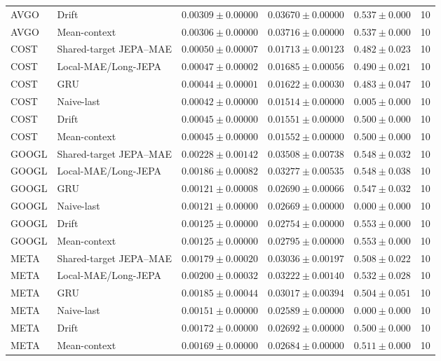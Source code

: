 \begin{longtable}{llrrrr}
AVGO & Drift & $0.00309 \pm 0.00000$ & $0.03670 \pm 0.00000$ & $0.537 \pm 0.000$ & 10 \\
AVGO & Mean-context & $0.00306 \pm 0.00000$ & $0.03716 \pm 0.00000$ & $0.537 \pm 0.000$ & 10 \\
COST & Shared-target JEPA--MAE & $0.00050 \pm 0.00007$ & $0.01713 \pm 0.00123$ & $0.482 \pm 0.023$ & 10 \\
COST & Local-MAE/Long-JEPA & $0.00047 \pm 0.00002$ & $0.01685 \pm 0.00056$ & $0.490 \pm 0.021$ & 10 \\
COST & GRU & $0.00044 \pm 0.00001$ & $0.01622 \pm 0.00030$ & $0.483 \pm 0.047$ & 10 \\
COST & Naive-last & $0.00042 \pm 0.00000$ & $0.01514 \pm 0.00000$ & $0.005 \pm 0.000$ & 10 \\
COST & Drift & $0.00045 \pm 0.00000$ & $0.01551 \pm 0.00000$ & $0.500 \pm 0.000$ & 10 \\
COST & Mean-context & $0.00045 \pm 0.00000$ & $0.01552 \pm 0.00000$ & $0.500 \pm 0.000$ & 10 \\
GOOGL & Shared-target JEPA--MAE & $0.00228 \pm 0.00142$ & $0.03508 \pm 0.00738$ & $0.548 \pm 0.032$ & 10 \\
GOOGL & Local-MAE/Long-JEPA & $0.00186 \pm 0.00082$ & $0.03277 \pm 0.00535$ & $0.548 \pm 0.038$ & 10 \\
GOOGL & GRU & $0.00121 \pm 0.00008$ & $0.02690 \pm 0.00066$ & $0.547 \pm 0.032$ & 10 \\
GOOGL & Naive-last & $0.00121 \pm 0.00000$ & $0.02669 \pm 0.00000$ & $0.000 \pm 0.000$ & 10 \\
GOOGL & Drift & $0.00125 \pm 0.00000$ & $0.02754 \pm 0.00000$ & $0.553 \pm 0.000$ & 10 \\
GOOGL & Mean-context & $0.00125 \pm 0.00000$ & $0.02795 \pm 0.00000$ & $0.553 \pm 0.000$ & 10 \\
META & Shared-target JEPA--MAE & $0.00179 \pm 0.00020$ & $0.03036 \pm 0.00197$ & $0.508 \pm 0.022$ & 10 \\
META & Local-MAE/Long-JEPA & $0.00200 \pm 0.00032$ & $0.03222 \pm 0.00140$ & $0.532 \pm 0.028$ & 10 \\
META & GRU & $0.00185 \pm 0.00044$ & $0.03017 \pm 0.00394$ & $0.504 \pm 0.051$ & 10 \\
META & Naive-last & $0.00151 \pm 0.00000$ & $0.02589 \pm 0.00000$ & $0.000 \pm 0.000$ & 10 \\
META & Drift & $0.00172 \pm 0.00000$ & $0.02692 \pm 0.00000$ & $0.500 \pm 0.000$ & 10 \\
META & Mean-context & $0.00169 \pm 0.00000$ & $0.02684 \pm 0.00000$ & $0.511 \pm 0.000$ & 10 \\

\end{longtable}
